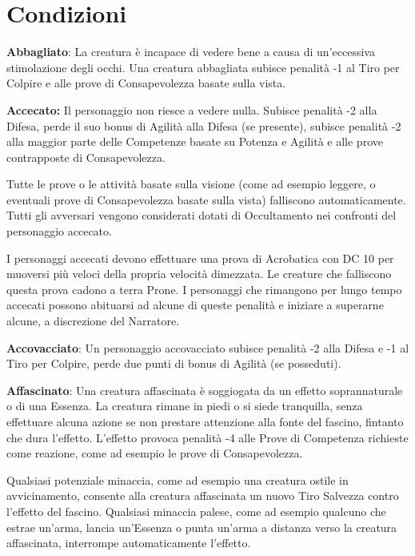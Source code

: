 \documentclass[a4paper,11pt,twoside,openany]{book}
\begin{document}
\section{Condizioni}

\label{condizioni}

\textbf{Abbagliato}: La creatura è incapace di vedere bene a causa di un'eccessiva stimolazione degli occhi. Una creatura abbagliata subisce penalità -1 al Tiro per Colpire e alle prove di Consapevolezza basate sulla vista.

\textbf{Accecato:} Il personaggio non riesce a vedere nulla. Subisce penalità -2 alla Difesa, perde il suo bonus di Agilità alla Difesa (se presente), subisce penalità -2 alla maggior parte delle Competenze basate su Potenza e Agilità e alle prove contrapposte di Consapevolezza.

Tutte le prove o le attività basate sulla visione (come ad esempio leggere, o eventuali prove di Consapevolezza basate sulla vista) falliscono automaticamente. Tutti gli avversari vengono considerati dotati di Occultamento nei confronti del personaggio accecato.

I personaggi accecati devono effettuare una prova di Acrobatica con DC 10 per muoversi più veloci della propria velocità dimezzata. Le creature che falliscono questa prova cadono a terra Prone. I personaggi che rimangono per lungo tempo accecati possono abituarsi ad alcune di queste penalità e iniziare a superarne alcune, a discrezione del Narratore.

\textbf{Accovacciato}: Un personaggio accovacciato subisce penalità -2 alla Difesa e -1 al Tiro per Colpire, perde due punti di bonus di Agilità (se posseduti).

\textbf{Affascinato}: Una creatura affascinata è soggiogata da un effetto soprannaturale o di una Essenza. La creatura rimane in piedi o si siede tranquilla, senza effettuare alcuna azione se non prestare attenzione alla fonte del fascino, fintanto che dura l'effetto. L'effetto provoca penalità -4 alle Prove di Competenza richieste come reazione, come ad esempio le prove di Consapevolezza.

Qualsiasi potenziale minaccia, come ad esempio una creatura ostile in avvicinamento, consente alla creatura affascinata un nuovo Tiro Salvezza contro l'effetto del fascino. Qualsiasi minaccia palese, come ad esempio qualcuno che estrae un'arma, lancia un'Essenza o punta un'arma a distanza verso la creatura affascinata, interrompe automaticamente l'effetto.
\end{document}
